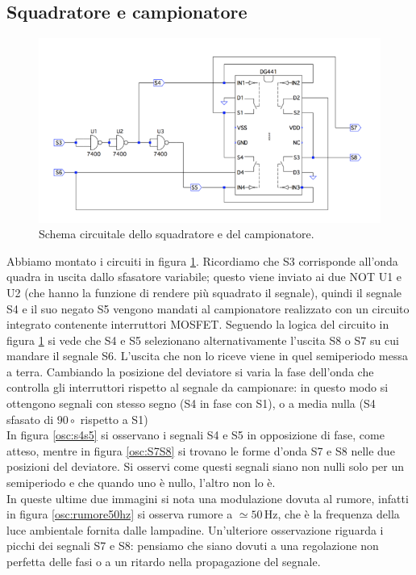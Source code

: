 \documentclass[10pt,a4paper]{article}
\begin{document}
\subsection{Squadratore e campionatore}

\begin{figure}[!htb]
  \centering
  \includegraphics[scale=0.75]{sqadratore-campionatore.png}
\caption{Schema circuitale dello squadratore e del campionatore.\label{fig:sqadratore-campionatore}}
\end{figure}

Abbiamo montato i circuiti in figura \ref{fig:sqadratore-campionatore}. Ricordiamo che S3 corrisponde all'onda quadra in uscita dallo sfasatore variabile; questo viene inviato ai due NOT U1 e U2 (che hanno la funzione di rendere più squadrato il segnale), quindi il segnale S4 e il suo negato S5 vengono mandati al campionatore realizzato con un circuito integrato contenente interruttori MOSFET. Seguendo la logica del circuito in figura \ref{fig:sqadratore-campionatore} si vede che S4 e S5 selezionano alternativamente l'uscita S8 o S7 su cui mandare il segnale S6. L'uscita che non lo riceve viene in quel semiperiodo messa a terra.
Cambiando la posizione del deviatore si varia la fase dell'onda che controlla gli interruttori rispetto al segnale da campionare: in questo modo si ottengono segnali con stesso segno (S4 in fase con S1), o a media nulla (S4 sfasato di $90\circ$ rispetto a S1)\\
In figura \ref{osc:s4s5} si osservano i segnali S4 e S5 in opposizione di fase, come atteso, mentre in figura \ref{osc:S7S8} si trovano le forme d'onda S7 e S8 nelle due posizioni del deviatore. Si osservi come questi segnali siano non nulli solo per un semiperiodo e che quando uno è nullo, l'altro non lo è.\\ In queste ultime due immagini si nota una modulazione dovuta al rumore, infatti in figura \ref{osc:rumore50hz} si osserva rumore a $\simeq 50\,\mbox{Hz}$, che è la frequenza della luce ambientale fornita dalle lampadine. %
Un'ulteriore osservazione riguarda i picchi dei segnali S7 e S8: pensiamo che siano dovuti a una regolazione non perfetta delle fasi o a un ritardo nella propagazione del segnale.
\end{document}
